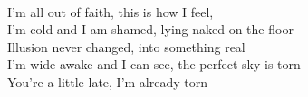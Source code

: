 \\
I'm all out of faith, this is how I feel,\\
I'm cold and I am shamed, lying naked on the floor \\
Illusion never changed, into something real \\
I'm wide awake and I can see, the perfect sky is torn \\
You're a little late, I'm already torn \\
